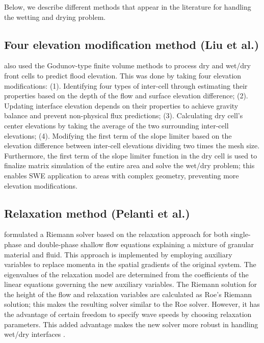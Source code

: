 \documentclass[10pt,a4paper]{article}
\begin{document}
	Below, we describe different methods that appear in the literature for handling the wetting and drying problem.
	
	\subsection{Four elevation modification  method (Liu et al.)}
	  \citet{li-ta-wa-ca-ba-ch-li:2021} also used the Godunov-type finite volume methods to process dry and wet/dry front cells to predict flood elevation. This was done by taking four elevation modifications: (1).  Identifying four types of inter-cell through estimating their properties based on the depth of the flow and surface elevation difference; (2). Updating interface elevation depends on their properties to achieve gravity balance and prevent non-physical flux predictions;  (3).  Calculating dry cell's center elevations by taking the average of the two surrounding inter-cell elevations; (4). Modifying the first term of the slope limiter based on the elevation difference between inter-cell elevations dividing two times the mesh size. Furthermore, the first term of the slope limiter function in the dry cell is used to finalize matrix simulation of the entire area and solve the wet/dry problem; this enables SWE application to areas with complex geometry, preventing more elevation modifications.
	
	\subsection{Relaxation method (Pelanti et al.)}
	
	  \citet{pelanti2011riemann} formulated a Riemann solver based on the relaxation approach for both single-phase and double-phase shallow flow equations explaining a mixture of granular material and fluid. This approach is implemented by employing auxiliary variables to replace momenta in the spatial gradients of the original system. The eigenvalues of the relaxation model are determined from the coefficients of the linear equations governing the new auxiliary variables.  The Riemann solution for the height of the flow and relaxation variables are calculated as Roe's Riemann solution; this makes the resulting solver similar to the Roe solver. However, it has the advantage of certain freedom to specify wave speeds by choosing relaxation parameters. This added advantage makes the new solver more robust in handling wet/dry interfaces \citep{pelanti2008relaxation,pelanti2011riemann}.
	
\end{document}
